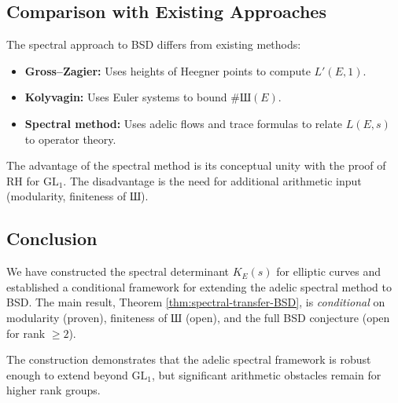 \subsection{Comparison with Existing Approaches}

The spectral approach to BSD differs from existing methods:
\begin{itemize}
\item \textbf{Gross–Zagier:} Uses heights of Heegner points to compute $L'(E, 1)$.
\item \textbf{Kolyvagin:} Uses Euler systems to bound $\#\text{Ш}(E)$.
\item \textbf{Spectral method:} Uses adelic flows and trace formulas to relate $L(E, s)$ to operator theory.
\end{itemize}

The advantage of the spectral method is its conceptual unity with the proof of RH for $\mathrm{GL}_1$. The disadvantage is the need for additional arithmetic input (modularity, finiteness of $\text{Ш}$).

\subsection{Conclusion}

We have constructed the spectral determinant $K_E(s)$ for elliptic curves and established a conditional framework for extending the adelic spectral method to BSD. The main result, Theorem \ref{thm:spectral-transfer-BSD}, is \emph{conditional} on modularity (proven), finiteness of $\text{Ш}$ (open), and the full BSD conjecture (open for rank $\geq 2$).

The construction demonstrates that the adelic spectral framework is robust enough to extend beyond $\mathrm{GL}_1$, but significant arithmetic obstacles remain for higher rank groups.
